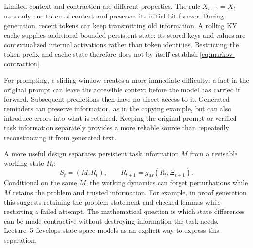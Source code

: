 \documentclass[11pt,twoside]{article}
\theoremstyle{definition}
\theoremstyle{remark}
\begin{document}
Limited context and contraction are different properties. The rule
\(X_{t+1}=X_t\) uses only one token of context and preserves its initial
bit forever. During generation, recent tokens can keep transmitting old
information. A rolling KV cache supplies additional bounded persistent state:
its stored keys and values are contextualized internal activations rather
than token identities.
Restricting the token prefix and cache state therefore does not by itself
establish \cref{eq:markov-contraction}.

For prompting, a sliding window creates a more immediate difficulty:
a fact in the original prompt can leave the accessible context before
the model has carried it forward. Subsequent predictions then have no
direct access to it. Generated reminders can preserve information, as
in the copying example, but can also introduce errors into what is retained.
Keeping the original prompt or verified task information separately
provides a more reliable source than repeatedly reconstructing it from
generated text.

A more useful design separates persistent task information \(M\) from
a revisable working state \(R_t\):
\begin{equation}
 S_t=(M,R_t),\qquad
 R_{t+1}=g_M(R_t,\Xi_{t+1}).
 \label{eq:persistent-working-memory}
\end{equation}
Conditional on the same \(M\), the working dynamics can forget
perturbations while \(M\) retains the problem and trusted information.
For example, in proof generation this suggests retaining the problem
statement and checked lemmas while restarting a failed attempt.
The mathematical question is which state differences can be made
contractive without destroying information the task needs.
Lecture~5 develops state-space models as an explicit way to express this separation.
\end{document}
